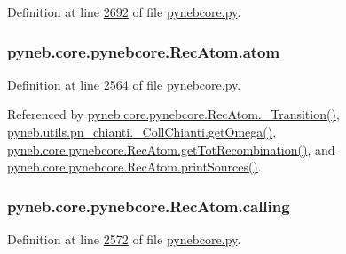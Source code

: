 Definition at line \hyperlink{pynebcore_8py_source_l02692}{2692} of file \hyperlink{pynebcore_8py_source}{pynebcore.\+py}.

\hypertarget{classpyneb_1_1core_1_1pynebcore_1_1_rec_atom_a1a2aa175da6b5b8847f409e37437e3d3}{}
\subsubsection[{atom}]{\setlength{\rightskip}{0pt plus 5cm}pyneb.\+core.\+pynebcore.\+Rec\+Atom.\+atom}\label{classpyneb_1_1core_1_1pynebcore_1_1_rec_atom_a1a2aa175da6b5b8847f409e37437e3d3}


Definition at line \hyperlink{pynebcore_8py_source_l02564}{2564} of file \hyperlink{pynebcore_8py_source}{pynebcore.\+py}.



Referenced by \hyperlink{pynebcore_8py_source_l02696}{pyneb.\+core.\+pynebcore.\+Rec\+Atom.\+\_\+\+Transition()}, \hyperlink{pn__chianti_8py_source_l00484}{pyneb.\+utils.\+pn\+\_\+chianti.\+\_\+\+Coll\+Chianti.\+get\+Omega()}, \hyperlink{pynebcore_8py_source_l02735}{pyneb.\+core.\+pynebcore.\+Rec\+Atom.\+get\+Tot\+Recombination()}, and \hyperlink{pynebcore_8py_source_l02796}{pyneb.\+core.\+pynebcore.\+Rec\+Atom.\+print\+Sources()}.

\hypertarget{classpyneb_1_1core_1_1pynebcore_1_1_rec_atom_a82ec425ebba32b73a5d9ae52717d47c4}{}
\subsubsection[{calling}]{\setlength{\rightskip}{0pt plus 5cm}pyneb.\+core.\+pynebcore.\+Rec\+Atom.\+calling}\label{classpyneb_1_1core_1_1pynebcore_1_1_rec_atom_a82ec425ebba32b73a5d9ae52717d47c4}


Definition at line \hyperlink{pynebcore_8py_source_l02572}{2572} of file \hyperlink{pynebcore_8py_source}{pynebcore.\+py}.



